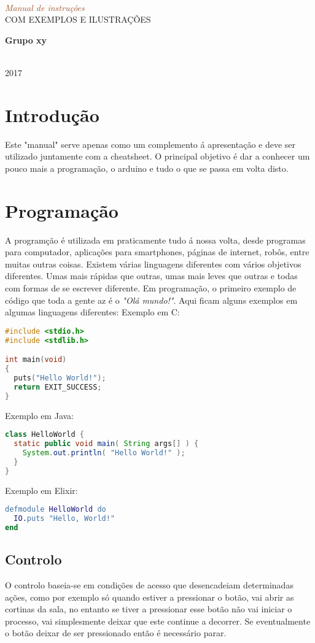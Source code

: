 ﻿\documentclass{article}
\newcommand*{\plogo}{\fbox{$\mathcal{ED}$}} %
\newcommand*{\rotrt}[1]{\rotatebox{90}{#1}} %
\newcommand*{\rotlft}[1]{\rotatebox{-90}{#1}} %
\newcommand*{\titleBC}{\begingroup %
\centering %

\def\CP{\textit{\Huge Manual de instruções}} %

\settowidth{\unitlength}{\CP} %
{\color{LightGoldenrod}\resizebox*{\unitlength}{\baselineskip}{\rotrt{$\}$}}} \\[\baselineskip] %
\textcolor{Sienna}{\CP} \\[\baselineskip] %
{\color{RosyBrown}\Large COM EXEMPLOS E ILUSTRAÇÕES} \\ %
{\color{LightGoldenrod}\resizebox*{\unitlength}{\baselineskip}{\rotlft{$\}$}}} %

\vfill %

{\Large\textbf{Grupo xy}}\\ %

\vfill %

\plogo\\[0.5\baselineskip] %
2017 %

\endgroup}
\begin{document}
\pagestyle{empty} %
\titleBC %

\pagebreak
\tableofcontents
\pagebreak

\section{Introdução}
Este "manual" serve apenas como um complemento á apresentação e deve ser utilizado juntamente com a cheatsheet. O principal objetivo é dar a conhecer um pouco mais a programação, o arduino e tudo o que se passa em volta disto.

\section{Programação}
A programção é utilizada em praticamente tudo á nossa volta, desde programas para computador, aplicações para smartphones, páginas de internet, robôs, entre muitas outras coisas.\newline
Existem várias linguagens diferentes com vários objetivos diferentes. Umas mais rápidas que outras, umas mais leves que outras e todas com formas de se escrever diferente.\newline
Em programação, o primeiro exemplo de código que toda a gente az é o \textit{"Olá mundo!"}. Aqui ficam alguns exemplos em algumas linguagens diferentes:\newline
Exemplo em C:
\begin{lstlisting}[language=C]
#include <stdio.h>
#include <stdlib.h>

int main(void)
{
  puts("Hello World!");
  return EXIT_SUCCESS;
}
\end{lstlisting}
Exemplo em Java:
\begin{lstlisting}[language=Java]
class HelloWorld {
  static public void main( String args[] ) {
    System.out.println( "Hello World!" );
  }
}
\end{lstlisting}
Exemplo em Elixir:
\begin{lstlisting}[language=erlang]
defmodule HelloWorld do
  IO.puts "Hello, World!"
end
\end{lstlisting}

\subsection{Controlo}
O controlo baseia-se em condições de acesso que desencadeiam determinadas ações, como por exemplo só quando estiver a pressionar o botão, vai abrir as cortinas da sala, no entanto se tiver a pressionar esse botão não vai iniciar o processo, vai simplesmente deixar que este continue a decorrer. Se eventualmente o botão deixar de ser pressionado então é necessário parar.\newline
\end{document}
